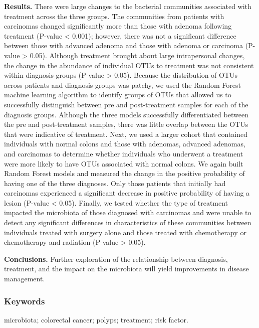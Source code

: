 \documentclass[12pt,]{article}
\begin{document}
\textbf{Results.} There were large changes to the bacterial communities
associated with treatment across the three groups. The communities from
patients with carcinomas changed significantly more than those with
adenoma following treatment (P-value \textless{} 0.001); however, there
was not a significant difference between those with advanced adenoma and
those with adenoma or carcinoma (P-value \textgreater{} 0.05). Although
treatment brought about large intrapersonal changes, the change in the
abundance of individual OTUs to treatment was not consistent within
diagnosis groups (P-value \textgreater{} 0.05). Because the distribution
of OTUs across patients and diagnosis groups was patchy, we used the
Random Forest machine learning algorithm to identify groups of OTUs that
allowed us to successfully distinguish between pre and post-treatment
samples for each of the diagnosis groups. Although the three models
successfully differentiated between the pre and post-treatment samples,
there was little overlap between the OTUs that were indicative of
treatment. Next, we used a larger cohort that contained individuals with
normal colons and those with adenomas, advanced adenomas, and carcinomas
to determine whether individuals who underwent a treatment were more
likely to have OTUs associated with normal colons. We again built Random
Forest models and measured the change in the positive probability of
having one of the three diagnoses. Only those patients that initially
had carcinomas experienced a significant decrease in positive
probability of having a lesion (P-value \textless{} 0.05). Finally, we
tested whether the type of treatment impacted the microbiota of those
diagnosed with carcinomas and were unable to detect any significant
differences in characteristics of these communities between individuals
treated with surgery alone and those treated with chemotherapy or
chemotherapy and radiation (P-value \textgreater{} 0.05).

\textbf{Conclusions.} Further exploration of the relationship between
diagnosis, treatment, and the impact on the microbiota will yield
improvements in disease management.

\subsubsection{Keywords}\label{keywords}

microbiota; colorectal cancer; polyps; treatment; risk factor.

\newpage
\end{document}
